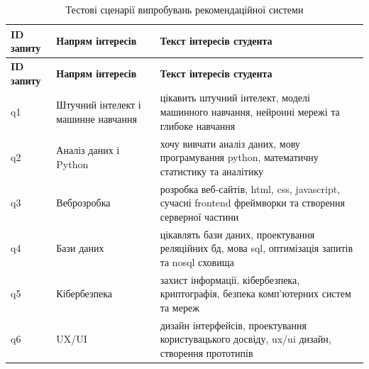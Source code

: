 \documentclass[
]{article}
\begin{document}
\begin{longtable}[]{@{}
  >{\raggedright\arraybackslash}p{}
  >{\raggedright\arraybackslash}p{}
  >{\raggedright\arraybackslash}p{}@{}}
\caption[Тестові сценарії випробувань рекомендаційної системи]{Тестові
сценарії випробувань рекомендаційної системи}\tabularnewline
\toprule\noalign{}
\begin{minipage}[b]{\linewidth}\raggedright
\textbf{ID запиту}
\end{minipage} & \begin{minipage}[b]{\linewidth}\raggedright
\textbf{Напрям інтересів}
\end{minipage} & \begin{minipage}[b]{\linewidth}\raggedright
\textbf{Текст інтересів студента}
\end{minipage} \\
\midrule\noalign{}
\endfirsthead
\toprule\noalign{}
\begin{minipage}[b]{\linewidth}\raggedright
\textbf{ID запиту}
\end{minipage} & \begin{minipage}[b]{\linewidth}\raggedright
\textbf{Напрям інтересів}
\end{minipage} & \begin{minipage}[b]{\linewidth}\raggedright
\textbf{Текст інтересів студента}
\end{minipage} \\
\midrule\noalign{}
\endhead
\bottomrule\noalign{}
\endlastfoot
q1 & Штучний інтелект і машинне навчання & цікавить штучний інтелект,
моделі машинного навчання, нейронні мережі та глибоке навчання \\
q2 & Аналіз даних і Python & хочу вивчати аналіз даних, мову
програмування python, математичну статистику та аналітику \\
q3 & Веброзробка & розробка веб-сайтів, html, css, javascript, сучасні
frontend фреймворки та створення серверної частини \\
q4 & Бази даних & цікавлять бази даних, проектування реляційних бд, мова
sql, оптимізація запитів та nosql сховища \\
q5 & Кібербезпека & захист інформації, кібербезпека, криптографія,
безпека комп'ютерних систем та мереж \\
q6 & UX/UI & дизайн інтерфейсів, проектування користувацького досвіду,
ux/ui дизайн, створення прототипів \\

\end{longtable}
\end{document}
